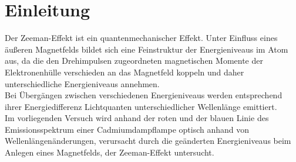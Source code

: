 \section{Einleitung}
\label{sec:Einleitung}
Der Zeeman-Effekt ist ein quantenmechanischer Effekt.
Unter Einfluss eines äußeren Magnetfelds bildet sich eine Feinstruktur der Energieniveaus im Atom aus, da die den Drehimpulsen zugeordneten magnetischen Momente der Elektronenhülle verschieden an das Magnetfeld koppeln und daher unterschiedliche Energieniveaus annehmen.\\
Bei Übergängen zwischen verschiedenen Energieniveaus werden entsprechend ihrer Energiedifferenz Lichtquanten unterschiedlicher Wellenlänge emittiert.\\
Im vorliegenden Versuch wird anhand der roten und der blauen Linie des Emissionsspektrum einer Cadmiumdampflampe
optisch anhand von Wellenlängenänderungen, verursacht durch die geänderten Energieniveaus beim Anlegen eines Magnetfelds, der Zeeman-Effekt untersucht.
